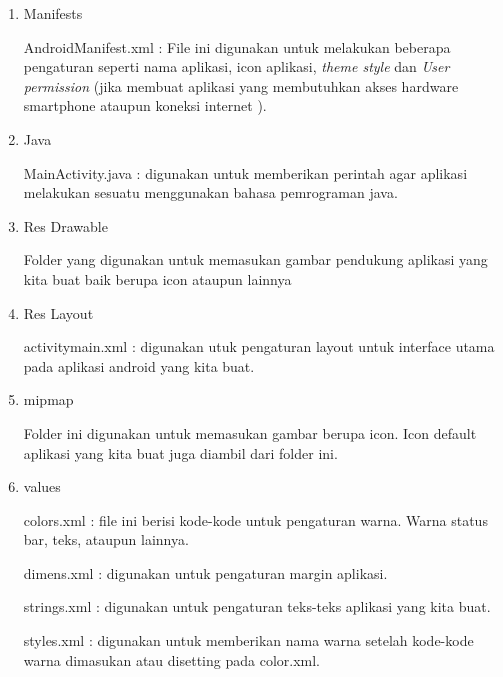    \begin{enumerate}
        \item Manifests 
        \par AndroidManifest.xml :  File ini digunakan untuk melakukan beberapa pengaturan seperti nama aplikasi, icon aplikasi, \textit{theme style } dan \textit{User permission} (jika membuat aplikasi yang membutuhkan akses hardware smartphone ataupun koneksi internet ).
        \item Java
        \par MainActivity.java : digunakan untuk memberikan perintah agar aplikasi melakukan sesuatu menggunakan bahasa pemrograman java.
        \item Res Drawable
        \par Folder yang digunakan untuk memasukan gambar pendukung aplikasi yang kita buat baik berupa icon ataupun lainnya
        \item Res Layout
        \par activitymain.xml : digunakan utuk pengaturan layout untuk interface utama pada aplikasi android yang kita buat.
        \item mipmap
        \par Folder ini digunakan untuk memasukan gambar berupa icon. Icon default aplikasi yang kita buat juga diambil dari folder ini.
        \item values 
        \par colors.xml : file ini berisi kode-kode untuk pengaturan warna. Warna status bar, teks, ataupun lainnya. 
        \par dimens.xml : digunakan untuk pengaturan margin aplikasi.
        \par strings.xml : digunakan untuk pengaturan teks-teks aplikasi yang kita buat.
        \par styles.xml : digunakan untuk memberikan nama warna setelah kode-kode warna dimasukan atau disetting pada color.xml.
        \par 
    \end{enumerate}

   

